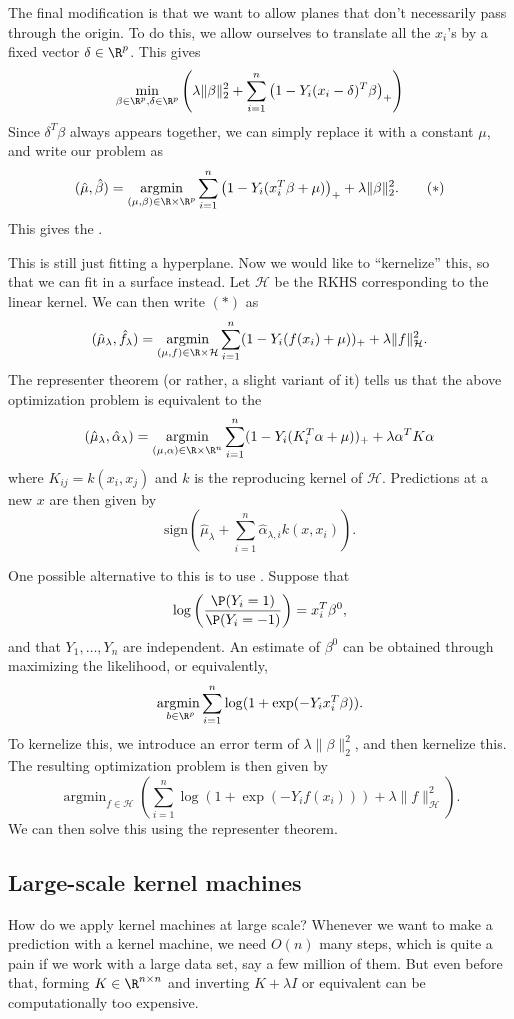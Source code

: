 \documentclass[a4paper]{article}
\DeclareMathOperator*\argmin{argmin}
\begin{document}
The final modification is that we want to allow planes that don't necessarily pass through the origin. To do this, we allow ourselves to translate all the $x_i$'s by a fixed vector $\delta \in \R^p$. This gives
\[
  \min_{\beta \in \R^p, \delta \in \R^p} \left(\lambda \|\beta\|_2^2 + \sum_{i = 1}^n \left(1 - Y_i (x_i - \delta)^T \beta\right)_+\right)
\]
Since $\delta^T \beta$ always appears together, we can simply replace it with a constant $\mu$, and write our problem as
\[
  (\hat{\mu}, \hat{\beta}) = \argmin_{(\mu, \beta) \in \R \times \R^p} \sum_{i = 1}^n \left(1 - Y_i (x_i^T \beta + \mu)\right)_+ + \lambda \|\beta\|_2^2.\tag{$*$}
\]
This gives the .

This is still just fitting a hyperplane. Now we would like to ``kernelize'' this, so that we can fit in a surface instead. Let $\mathcal{H}$ be the RKHS corresponding to the linear kernel. We can then write $(*)$ as
\[
  (\hat{\mu}_\lambda, \hat{f}_\lambda) = \argmin_{(\mu, f) \in \R \times \mathcal{H}} \sum_{i = 1}^n (1 - Y_i( f(x_i) + \mu))_+ + \lambda \|f\|_{\mathcal{H}}^2.
\]
The representer theorem (or rather, a slight variant of it) tells us that the above optimization problem is equivalent to the 
\[
  (\hat{\mu}_\lambda, \hat{\alpha}_\lambda) = \argmin_{(\mu, \alpha) \in \R \times \R^n}\sum_{i = 1}^n (1 - Y_i (K_i^T \alpha + \mu))_+ + \lambda \alpha^T K \alpha
\]
where $K_{ij} = k(x_i, x_j)$ and $k$ is the reproducing kernel of $\mathcal{H}$. Predictions at a new $x$ are then given by
\[
  \mathrm{sign} \left(\hat{\mu}_\lambda + \sum_{i = 1}^n \hat{\alpha}_{\lambda, i} k(x, x_i)\right).
\]

One possible alternative to this is to use . Suppose that
\[
  \log \left(\frac{\P(Y_i = 1)}{\P(Y_i = -1)}\right) = x_i^T \beta^0,
\]
and that $Y_1, \ldots, Y_n$ are independent. An estimate of $\beta^0$ can be obtained through maximizing the likelihood, or equivalently,
\[
  \argmin_{~b \in \R^p} \sum_{i = 1}^n \log (1 + \exp(-Y_i x_i^T \beta)).
\]
To kernelize this, we introduce an error term of $\lambda \|\beta\|_2^2$, and then kernelize this. The resulting optimization problem is then given by
\[
  \argmin_{f \in \mathcal{H}} \left( \sum_{i = 1}^n \log (1 + \exp (-Y_i f(x_i))) + \lambda \|f\|_{\mathcal{H}}^2\right).
\]
We can then solve this using the representer theorem.

\subsection{Large-scale kernel machines}
How do we apply kernel machines at large scale? Whenever we want to make a prediction with a kernel machine, we need $O(n)$ many steps, which is quite a pain if we work with a large data set, say a few million of them. But even before that, forming $K \in \R^{n \times n}$ and inverting $K + \lambda I$ or equivalent can be computationally too expensive.
\end{document}
